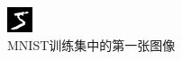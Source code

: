 \documentclass[titlepage,UTF8,zihao=-4]{ctexart}
\begin{document}
\begin{figure}[htbp] 
    \centering   
    \includegraphics[width=8 cm]{./Images/0.png}
    \caption{MNIST训练集中的第一张图像}\label{im1}
\end{figure}
\end{document}
